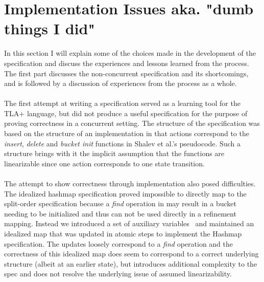 \documentclass{uit-thesis}
\begin{document}
\section{Implementation Issues aka. "dumb things I did"}
In this section I will explain some of the choices made in the development of the specification and discuss the experiences and lessons learned from the process. The first part discusses the non-concurrent specification and its shortcomings, and is followed by a discussion of experiences from the process as a whole. 
\\\\
The first attempt at writing a specification served as a learning tool for the TLA+ language, but did not produce a useful specification for the purpose of proving correctness in a concurrent setting. The structure of the specification was based on the structure of an implementation in that actions correspond to the \textit{insert}, \textit{delete} and \textit{bucket init} functions in Shalev et al.'s pseudocode. Such a structure brings with it the implicit assumption that the functions are linearizable since one action corresponds to one state transition.
\\\\
The attempt to show correctness through implementation also posed difficulties. The idealized hashmap specification proved impossible to directly map to the split-order specification because a \textit{find} operation in may result in a bucket needing to be initialized and thus can not be used directly in a refinement mapping. Instead we introduced a set of auxiliary variables~\cite{Lamport2019a} and maintained an idealized map that was updated in atomic steps to implement the Hashmap specification. The updates loosely correspond to a \textit{find} operation and the correctness of this idealized map does seem to correspond to a correct underlying structure (albeit at an earlier state), but introduces additional complexity to the spec and does not resolve the underlying issue of assumed linearizability.
\\
\end{document}
